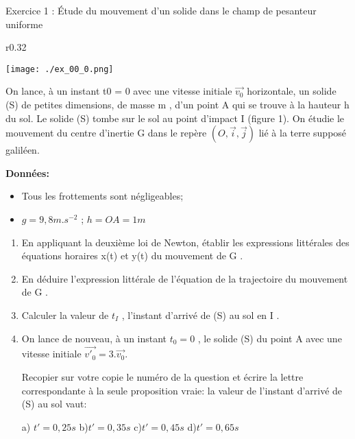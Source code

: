 \documentclass[12pt, french]{article}
\begin{document}
\begin{center}

\end{center}

\vspace{-0.2cm}
   \begin{Box2}{Exercice 1 : Étude du mouvement d'un solide dans le champ de pesanteur uniforme}

	\begin{wrapfigure}[4]{r}{0.32\textwidth}
  \begin{center}
	  \vspace{-0.6cm}
	\texttt{[image: ./ex\_00\_0.png]}
  \end{center}
\end{wrapfigure}

 
On lance, à un instant t0 = 0 avec une vitesse initiale $\vec{v_0}$
 horizontale, un solide (S) de petites dimensions, de masse m , d'un
point A qui se trouve à la hauteur h du sol. Le solide (S) tombe
sur le sol au point d'impact I (figure 1).
On étudie le mouvement du centre d'inertie G dans le repère $(O,\vec{i}, \vec{j})$ lié à la terre supposé galiléen.

\textbf{Données:}
\begin{itemize}
\item Tous les frottements sont négligeables;
\item $g = 9,8 m.s^{-2}$ ; $h = OA= 1 m$
\end{itemize}

\begin{enumerate}
	\item En appliquant la deuxième loi de Newton, établir les expressions littérales des équations horaires
x(t) et y(t) du mouvement de G .
\item En déduire l'expression littérale de l'équation de la trajectoire du mouvement de G .
\item Calculer la valeur de $t_I$ , l'instant d'arrivé de (S) au sol en I .
\item On lance de nouveau, à un instant $t_0 = 0$ , le solide (S) du point A avec une vitesse initiale
$\vec{v'_0} = 3.\vec{v_0}$.

Recopier sur votre copie le numéro de la question et écrire la lettre correspondante à la seule
proposition vraie:
la valeur de l'instant d'arrivé de (S) au sol vaut:

a) $t' = 0,25s$ \hspace{3cm} b)$t' = 0,35s$ \hspace{2cm} c)$t' = 0,45s$ \hspace{2cm} d)$t'=0,65s$

\end{enumerate}

   \end{Box2}
\end{document}
